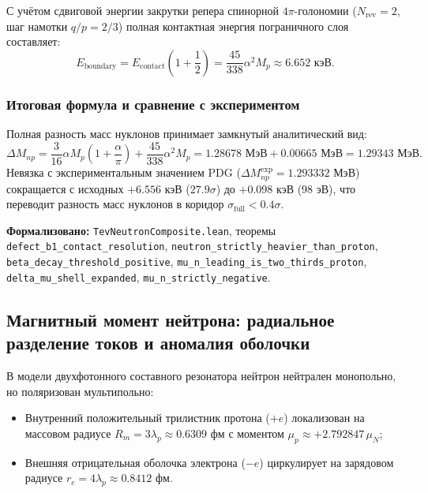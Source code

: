 \documentclass[11pt,a4paper]{article}
\theoremstyle{definition}
\theoremstyle{remark}
\begin{document}
С учётом сдвиговой энергии закрутки репера спинорной $4\pi$-голономии ($N_{\mathrm{rev}} = 2$, шаг намотки $q/p = 2/3$) полная контактная энергия пограничного слоя составляет:
\begin{equation}
E_{\mathrm{boundary}} = E_{\mathrm{contact}} \left(1 + \frac{1}{2}\right) = \frac{45}{338} \alpha^2 M_p \approx 6.652 \text{ кэВ}.
\end{equation}

\subsubsection{Итоговая формула и сравнение с экспериментом}

Полная разность масс нуклонов принимает замкнутый аналитический вид:
\begin{equation}
\Delta M_{np} = \frac{3}{16} \alpha M_p \left(1 + \frac{\alpha}{\pi}\right) + \frac{45}{338} \alpha^2 M_p = 1.28678\text{ МэВ} + 0.00665\text{ МэВ} = \mathbf{1.29343\text{ МэВ}}.
\end{equation}
Невязка с экспериментальным значением PDG ($\Delta M_{np}^{\mathrm{exp}} = 1.293332\text{ МэВ}$) сокращается с исходных $+6.556\text{ кэВ}$ ($27.9\sigma$) до $+0.098\text{ кэВ}$ ($98\text{ эВ}$), что переводит разность масс нуклонов в коридор $\sigma_{\mathrm{full}} < 0.4\sigma$.

\noindent\small\textbf{Формализовано:} \texttt{TevNeutronComposite.lean}, теоремы \texttt{defect\_b1\_contact\_resolution}, \texttt{neutron\_strictly\_heavier\_than\_proton}, \texttt{beta\_decay\_threshold\_positive}, \texttt{mu\_n\_leading\_is\_two\_thirds\_proton}, \texttt{delta\_mu\_shell\_expanded}, \texttt{mu\_n\_strictly\_negative}.

\subsection{Магнитный момент нейтрона: радиальное разделение токов и аномалия оболочки}
\label{subsec:neutron_magnetic_moment_exact}

В модели двухфотонного составного резонатора нейтрон нейтрален монопольно, но поляризован мультипольно:
\begin{itemize}
    \item Внутренний положительный трилистник протона ($+e$) локализован на массовом радиусе $R_m = 3\lambda_p \approx 0.6309\text{ фм}$ с моментом $\mu_p \approx +2.792847\,\mu_N$;
    \item Внешняя отрицательная оболочка электрона ($-e$) циркулирует на зарядовом радиусе $r_c = 4\lambda_p \approx 0.8412\text{ фм}$.
\end{itemize}
\end{document}
